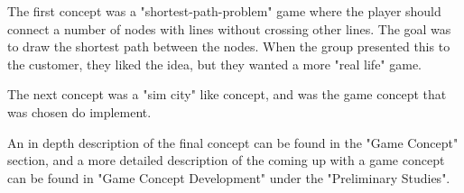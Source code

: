 	The first concept was a "shortest-path-problem" game where the player should
	connect a number of nodes with lines without crossing other lines. The goal 
	was to draw the shortest path between the nodes. When the group presented this
	to the customer, they liked the idea, but they wanted a more "real life" game.

	The next concept was a "sim city" like concept, and was the game concept that
	was chosen do implement. 

	An in depth description of the final concept can be found in the "Game Concept"
	section, and a more detailed description of the coming up with a game concept can 
	be found in "Game Concept Development" under the "Preliminary Studies". 

	\begin{figure}[H]
	\centering
		\subfigure{
}
\end{figure}

